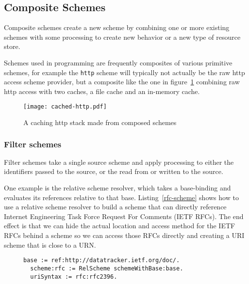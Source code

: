 \documentclass[preprint,authoryear]{acm_proc_article-sp}
\begin{document}
\subsection{Composite Schemes}
\label{compositeSchemes}
Composite schemes  create a new scheme by combining one or 
more existing schemes with some processing to create new behavior
or a new type of resource store.  

 Schemes used in programming 
are frequently composites of various primitive schemes, for example
the {\tt http} scheme will typically not actually be the raw http access
scheme provider, but a composite like the one in figure~\ref{fig:http-cached} combining
raw http access with two caches, a file cache and an in-memory cache.


\begin{figure}[htbp]
\begin{center}
\texttt{[image: cached-http.pdf]}
\caption{A caching http stack made from composed schemes}
\label{fig:http-cached}
\end{center}
\end{figure}


\subsubsection{Filter schemes}

Filter schemes take a single source scheme and apply processing to either
the identifiers passed to the source, or the read from or written to the source.


One example is the relative scheme resolver, which takes a base-binding
and evaluates its references relative to that base.  Listing~\ref{rfc-scheme} shows
how to use a relative scheme resolver to build a scheme that can directly
reference Internet Engineering Task Force Request For Comments (IETF RFCs).
The end effect is that we can hide the actual location and access method for
the IETF RFCs behind a scheme so we can access those RFCs directly and
creating a URI scheme that is close to a URN.


\begin{figure}[htbp]
\begin{lstlisting}[style=L,label=rfc-scheme,caption=Retrieving RFC 2396 (URI Syntax) via custom rfc: scheme.]
  base := ref:http://datatracker.ietf.org/doc/.
  scheme:rfc := RelScheme schemeWithBase:base.
  uriSyntax := rfc:rfc2396.
\end{lstlisting}
\end{figure}
\end{document}
